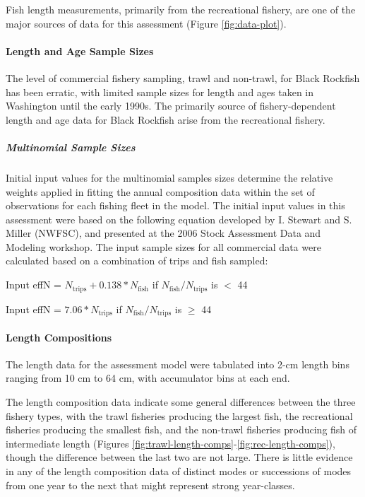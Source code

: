 \documentclass[11pt,
  letterpaper,
]{article}
\begin{document}
Fish length measurements, primarily from the recreational fishery, are one of the major sources of data for this assessment (Figure \ref{fig:data-plot}).

\hypertarget{length-and-age-sample-sizes}{%
\paragraph{Length and Age Sample Sizes}\label{length-and-age-sample-sizes}}

The level of commercial fishery sampling, trawl and non-trawl, for Black Rockfish has been erratic, with limited sample sizes for length and ages taken in Washington until the early 1990s. The primarily source of fishery-dependent length and age data for Black Rockfish arise from the recreational fishery.

\hypertarget{multinomial-sample-sizes}{%
\subparagraph{Multinomial Sample Sizes}\label{multinomial-sample-sizes}}

Initial input values for the multinomial samples sizes determine the relative weights applied in fitting the annual composition data within the set of observations for each fishing fleet in the model. The initial input values in this assessment were based on the following equation developed by I. Stewart and S. Miller (NWFSC), and presented at the 2006 Stock Assessment Data and Modeling workshop. The input sample sizes for all commercial data were calculated based on a combination of trips and fish sampled:

\begin{centering}

Input effN = $N_{\text{trips}} + 0.138 * N_{\text{fish}}$ if $N_{\text{fish}}/N_{\text{trips}}$ is $<$ 44

Input effN = $7.06 * N_{\text{trips}}$ if $N_{\text{fish}}/N_{\text{trips}}$ is $\geq$ 44

\end{centering}

\hypertarget{length-compositions}{%
\paragraph{Length Compositions}\label{length-compositions}}

The length data for the assessment model were tabulated into 2-cm length bins ranging from 10 cm to 64 cm, with accumulator bins at each end.

The length composition data indicate some general differences between the three fishery types, with the trawl fisheries producing the largest fish, the recreational fisheries producing the smallest fish, and the non-trawl fisheries producing fish of intermediate length (Figures \ref{fig:trawl-length-comps}-\ref{fig:rec-length-comps}), though the difference between the last two are not large. There is little evidence in any of the length composition data of distinct modes or successions of modes from one year to the next that might represent strong year-classes.
\end{document}
